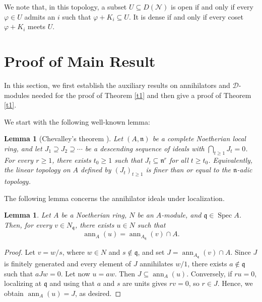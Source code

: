 \documentclass[11pt]{amsart}
\newtheorem{lemma}[theorem]{Lemma}
\theoremstyle{definition}
\newcommand{\n}{\mathfrak n}
\newcommand{\q}{\mathfrak q}
\newcommand{\D}{\mathcal D}
\newcommand{\N}{\mathcal N}
\DeclareMathOperator{\ann}{ann}
\DeclareMathOperator{\Spec}{Spec}
\begin{document}
We note that, in this topology, a subset $U\subseteq D(\N)$ is open if and only if every $\varphi\in U$ admits an $i$ such that $\varphi+K_i\subseteq U$. It is dense if and only if every coset
$\varphi+K_i$ meets $U$.

\section{Proof of Main Result}
In this section, we first establish the auxiliary results on annihilators and $\D$-modules needed for the proof of Theorem \ref{t1} and then give a proof of Theorem \ref{t1}.


We start with the following well-known lemma:

\begin{lemma}[Chevalley's theorem {\cite[Exercise 8.7]{MatCRT}}]\label{chevalley}
Let $(A,\n)$ be a complete Noetherian local ring, and let $J_1\supseteq J_2\supseteq\cdots$ be a descending sequence of ideals with $\bigcap_{t\geq1}J_t=0$. For every $r\geq1$, there exists $t_0\geq1$ such that $J_t\subseteq\n^r$ for all $t\geq t_0$. Equivalently, the linear topology on $A$ defined by $(J_t)_{t\geq 1}$ is finer than or equal to the $\n$-adic topology.
\end{lemma}
The following lemma concerns the annihilator ideals under localization.

\begin{lemma}\label{l1}
Let $A$ be a Noetherian ring, $N$ be an $A$-module, and $\q\in\Spec A$. Then, for every $v\in N_{\mathfrak q}$, there exists $u\in N$ such that
\[
\ann_A(u)
=
\ann_{A_{\q}}(v)\cap A.
\]
\end{lemma}
\begin{proof}
Let $v=w/s$, where $w\in N$ and $s\notin\mathfrak q$, and set $J=\ann_{A_{\mathfrak q}}(v)\cap A$. Since $J$ is finitely generated and every element of $J$ annihilates
$w/1$, there exists $a\notin\q$ such that $aJw=0$. Let now $u=aw$. Then $J\subseteq\ann_A(u)$. Conversely, if $ru=0$, localizing at $\q$ and using that $a$ and $s$ are units gives $rv=0$, so $r\in J$. Hence, we obtain $\ann_A(u)=J$, as desired.
\end{proof}

\end{document}
